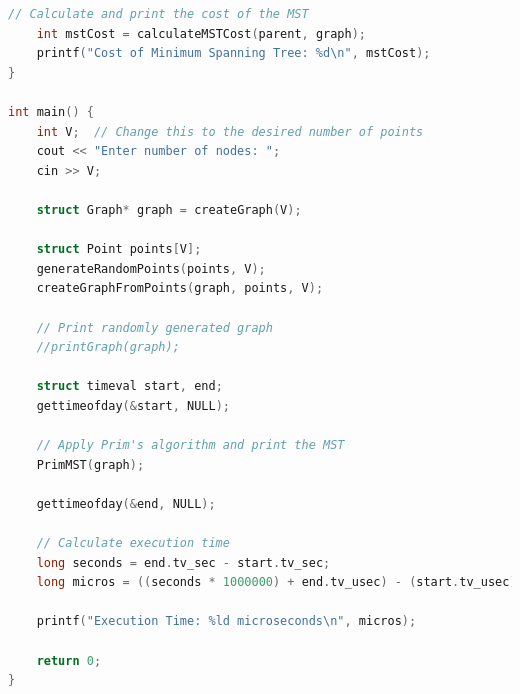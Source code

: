 \documentclass[a4paper, 10pt, twocolumn]{article}
\begin{document}
\begin{lstlisting}[language=C++, caption={C++ code for Naive Prim's  Algorithm}]
    // Calculate and print the cost of the MST
    int mstCost = calculateMSTCost(parent, graph);
    printf("Cost of Minimum Spanning Tree: %d\n", mstCost);
}

int main() {
	int V;  // Change this to the desired number of points
	cout << "Enter number of nodes: ";
	cin >> V;
    
    struct Graph* graph = createGraph(V);

    struct Point points[V];
    generateRandomPoints(points, V);
    createGraphFromPoints(graph, points, V);

    // Print randomly generated graph
    //printGraph(graph);

    struct timeval start, end;
    gettimeofday(&start, NULL);

    // Apply Prim's algorithm and print the MST
    PrimMST(graph);

    gettimeofday(&end, NULL);

    // Calculate execution time
    long seconds = end.tv_sec - start.tv_sec;
    long micros = ((seconds * 1000000) + end.tv_usec) - (start.tv_usec);

    printf("Execution Time: %ld microseconds\n", micros);

    return 0;
}
\end{lstlisting}
\newpage
\end{document}
